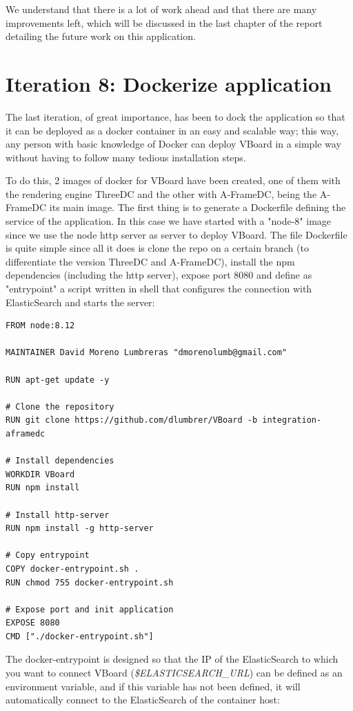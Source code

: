 \documentclass[a4paper, 12pt]{book}
\begin{document}
We understand that there is a lot of work ahead and that there are many improvements left, which will be discussed in the last chapter of the report detailing the future work on this application.

\section{Iteration 8: Dockerize application}
\label{sec:dockerize}

The last iteration, of great importance, has been to dock the application so that it can be deployed as a docker container in an easy and scalable way; this way, any person with basic knowledge of Docker can deploy VBoard in a simple way without having to follow many tedious installation steps.

To do this, 2 images of docker for VBoard have been created, one of them with the rendering engine ThreeDC and the other with A-FrameDC, being the A-FrameDC its main image. The first thing is to generate a Dockerfile defining the service of the application. In this case we have started with a "node-8" image since we use the node http server as server to deploy VBoard. The file Dockerfile is quite simple since all it does is clone the repo on a certain branch (to differentiate the version ThreeDC and A-FrameDC), install the npm dependencies (including the http server), expose port 8080 and define as "entrypoint" a script written in shell that configures the connection with ElasticSearch and starts the server:

\begin{lstlisting}[frame=single]
FROM node:8.12

MAINTAINER David Moreno Lumbreras "dmorenolumb@gmail.com"

RUN apt-get update -y

# Clone the repository
RUN git clone https://github.com/dlumbrer/VBoard -b integration-aframedc

# Install dependencies
WORKDIR VBoard
RUN npm install

# Install http-server
RUN npm install -g http-server

# Copy entrypoint
COPY docker-entrypoint.sh .
RUN chmod 755 docker-entrypoint.sh

# Expose port and init application
EXPOSE 8080
CMD ["./docker-entrypoint.sh"]
\end{lstlisting}

The docker-entrypoint is designed so that the IP of the ElasticSearch to which you want to connect VBoard (\textit{\$ELASTICSEARCH\_URL}) can be defined as an environment variable, and if this variable has not been defined, it will automatically connect to the ElasticSearch of the container host:
\end{document}

